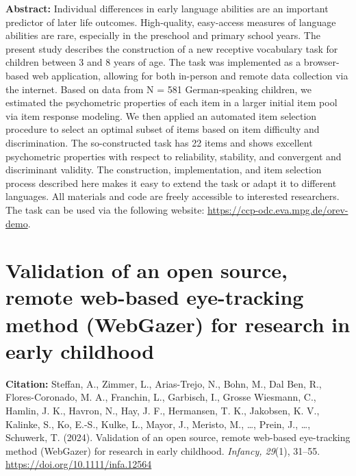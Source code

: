 \documentclass[
]{scrbook}
\begin{document}
\textbf{Abstract:} Individual differences in early language abilities are an important predictor of later life outcomes. High-quality, easy-access measures of language abilities are rare, especially in the preschool and primary school years. The present study describes the construction of a new receptive vocabulary task for children between 3 and 8 years of age. The task was implemented as a browser-based web application, allowing for both in-person and remote data collection via the internet. Based on data from N = 581 German-speaking children, we estimated the psychometric properties of each item in a larger initial item pool via item response modeling. We then applied an automated item selection procedure to select an optimal subset of items based on item difficulty and discrimination. The so-constructed task has 22 items and shows excellent psychometric properties with respect to reliability, stability, and convergent and discriminant validity. The construction, implementation, and item selection process described here makes it easy to extend the task or adapt it to different languages. All materials and code are freely accessible to interested researchers. The task can be used via the following website: \mbox{\url{https://ccp-odc.eva.mpg.de/orev-demo}}.

\newpage

\section*{Validation of an open source, remote web-based eye-tracking method (WebGazer) for research in early childhood}\label{manywebcams}

\textbf{Citation:} Steffan, A., Zimmer, L., Arias-Trejo, N., Bohn, M., Dal Ben, R., Flores-Coronado, M. A., Franchin, L., Garbisch, I., Grosse Wiesmann, C., Hamlin, J. K., Havron, N., Hay, J. F., Hermansen, T. K., Jakobsen, K. V., Kalinke, S., Ko, E.-S., Kulke, L., Mayor, J., Meristo, M., \ldots, Prein, J., \ldots, Schuwerk, T. (2024). Validation of an open source, remote web-based eye-tracking method (WebGazer) for research in early childhood. \emph{Infancy, 29}(1), 31--55. \mbox{\url{https://doi.org/10.1111/infa.12564}}
\end{document}

